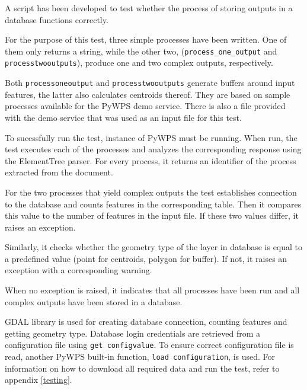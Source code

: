 A script has been developed to test whether the process of storing
outputs in a database functions correctly.

For the purpose of this test, three simple processes have been
written. One of them only returns a string, while the other two,
(\texttt{process\_one\_output} and \linebreak
\texttt{process\textunderscore two\textunderscore outputs}), produce
one and two complex outputs, respectively.

Both \texttt{process\textunderscore one\textunderscore output} and
\texttt{process\textunderscore two\textunderscore outputs} generate
buffers around input features, the latter also calculates centroids
thereof. They are based on sample processes available for the PyWPS
demo service. There is also a  file provided with the demo
service that was used as an input file for this test.

To sucessfully run the test, instance of PyWPS must be running. When
run, the test executes each of the processes and analyzes the
corresponding  response using the ElementTree 
parser. For every process, it returns an identifier of the process
extracted from the  document.

For the two processes that yield complex outputs the test establishes
connection to the database and counts features in the corresponding
table. Then it compares this value to the number of features in the
input file. If these two values differ, it raises an exception.

Similarly, it checks whether the geometry type of the layer in
database is equal to a predefined value (point for centroids, polygon
for buffer). If not, it raises an exception with a corresponding
warning.

When no exception is raised, it indicates that all processes have been
run and all complex outputs have been stored in a database.

GDAL library is used for creating database connection, counting
features and getting geometry type. Database login credentials are
retrieved from a configuration file using \texttt{get\textunderscore
  config\textunderscore value}. To ensure correct configuration file
is read, another PyWPS built-in function, \texttt{load\textunderscore
  configuration}, is used.
For information on how to download all required data and run the test,
refer to appendix \ref{testing}.


